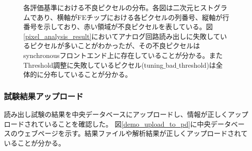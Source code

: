 \begin{figure}[bpt]
\caption[各評価基準における不良ピクセルの分布]{各評価基準における不良ピクセルの分布。各図は二次元ヒストグラムであり、横軸がFEチップにおける各ピクセルの列番号、縦軸が行番号を示しており、赤い領域が不良ピクセルを表している。図\ref{pixel_analysis_result}においてアナログ回路読み出しに失敗しているピクセルが多いことがわかったが、その不良ピクセルはsynchronousフロントエンド上に存在していることが分かる。またThreshold調整に失敗しているピクセル(tuning$\_$bad$\_$threshold)は全体的に分布していることが分かる。}
\label{pixel_analysis_result_dist}
\end{figure}

\subsubsection{試験結果アップロード}
読み出し試験の結果を中央データベースにアップロードし、情報が正しくアップロードされていることを確認した。
図\ref{demo_upload_to_pd}に中央データベースのウェブページを示す。結果ファイルや解析結果が正しくアップロードされていることが分かる。


